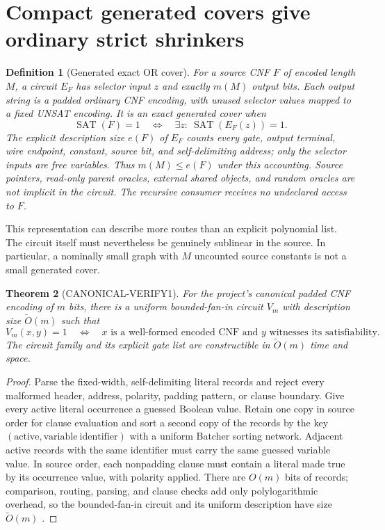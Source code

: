 \documentclass[11pt]{article}
\newtheorem{theorem}{Theorem}[section]
\newtheorem{definition}[theorem]{Definition}
\newcommand{\SAT}{\operatorname{SAT}}
\begin{document}
\section{Compact generated covers give ordinary strict shrinkers}
\label{sec:generated}

\begin{definition}[Generated exact OR cover]
For a source CNF $F$ of encoded length $M$, a circuit $E_F$ has selector
input $z$ and exactly $m(M)$ output bits.  Each output string is a padded
ordinary CNF encoding, with unused selector values mapped to a fixed UNSAT
encoding.  It is an exact generated cover when
\begin{equation}
 \SAT(F)=1\quad\Longleftrightarrow\quad
 \exists z:\ \SAT(E_F(z))=1.
 \label{eq:generated-cover}
\end{equation}
The explicit description size $e(F)$ of $E_F$ counts every gate, output
terminal, wire endpoint, constant, source bit, and self-delimiting address;
only the selector inputs are free variables.  Thus $m(M)\le e(F)$ under this
accounting.  Source pointers, read-only parent oracles, external shared
objects, and random oracles are not implicit in the circuit.  The recursive
consumer receives no undeclared access to $F$.
\end{definition}

This representation can describe more routes than an explicit polynomial
list.  The circuit itself must nevertheless be genuinely sublinear in the
source.  In particular, a nominally small graph with $M$ uncounted source
constants is not a small generated cover.

\begin{theorem}[CANONICAL-VERIFY1]\label{thm:canonical-verify}
For the project's canonical padded CNF encoding of $m$ bits, there is a
uniform bounded-fan-in circuit $V_m$ with description size
$\widetilde O(m)$ such that
\[
 V_m(x,y)=1
 \quad\Longleftrightarrow\quad
 x\text{ is a well-formed encoded CNF and }y\text{ witnesses its
 satisfiability}.
\]
The circuit family and its explicit gate list are constructible in
$\widetilde O(m)$ time and space.
\end{theorem}

\begin{proof}
Parse the fixed-width, self-delimiting literal records and reject every
malformed header, address, polarity, padding pattern, or clause boundary.
Give every active literal occurrence a guessed Boolean value.  Retain one
copy in source order for clause evaluation and sort a second copy of the
records by the key $(\mathrm{active},\mathrm{variable\ identifier})$ with a
uniform Batcher sorting network.  Adjacent active records with the same
identifier must carry the same guessed variable value.  In source order,
each nonpadding clause must contain a literal made true by its occurrence
value, with polarity applied.  There are $O(m)$ bits of records; comparison,
routing, parsing, and clause checks add only polylogarithmic overhead, so the
bounded-fan-in circuit and its uniform description have size
$\widetilde O(m)$ \cite{batcher1968sorting}.
\end{proof}
\end{document}

